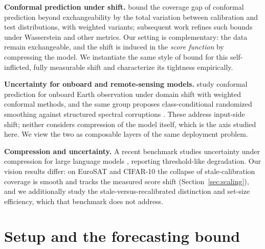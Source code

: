 \documentclass[11pt]{article}
\begin{document}
\textbf{Conformal prediction under shift.} \citet{barber2023} bound the
coverage gap of conformal prediction beyond exchangeability by the total
variation between calibration and test distributions, with weighted variants;
subsequent work refines such bounds under Wasserstein and other metrics. Our
setting is complementary: the data remain exchangeable, and the shift is
induced in the \emph{score function} by compressing the model. We instantiate
the same style of bound for this self-inflicted, fully measurable shift and
characterize its tightness empirically.

\textbf{Uncertainty for onboard and remote-sensing models.}
\citet{marchante2025} study conformal prediction for onboard Earth observation
under domain shift with weighted conformal methods, and the same group proposes
class-conditional randomized smoothing against structured spectral corruptions
\citep{marchante2025copa}. These address input-side shift; neither considers
compression of the model itself, which is the axis studied here. We view the
two as composable layers of the same deployment problem.

\textbf{Compression and uncertainty.} A recent benchmark studies uncertainty
under compression for large language models \citep{compressionUQ2026},
reporting threshold-like degradation. Our vision results differ: on EuroSAT
and CIFAR-10 the collapse of stale-calibration coverage is smooth and tracks
the measured score shift (Section~\ref{sec:scaling}), and we additionally
study the stale-versus-recalibrated distinction and set-size efficiency, which
that benchmark does not address.

\section{Setup and the forecasting bound}\label{sec:bound}
\end{document}
